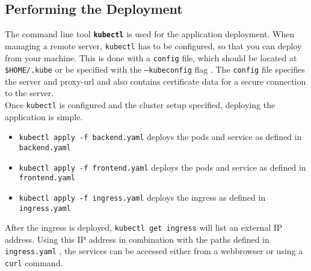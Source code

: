     \subsection{Performing the Deployment}
        The command line tool \textbf{\texttt{kubectl}} is used for the application deployment.
        When managing a remote server, \texttt{kubectl} has to be configured, so that you can deploy from your machine.
        This is done with a \texttt{config} file, which should be located at \texttt{\$HOME/.kube} or be specified with the \texttt{--kubeconfig} flag \cite{Kubernetes_kubeconfig:2022}.
        The \texttt{config} file specifies the server and proxy-url and also contains certificate data for a secure connection to the server.
        \medskip\\
        Once \texttt{kubectl} is configured and the cluster setup specified, deploying the application is simple.
        \begin{itemize}
            \item \texttt{kubectl apply -f backend.yaml} deploys the pods and service as defined in \texttt{backend.yaml}
            \item \texttt{kubectl apply -f frontend.yaml} deploys the pods and service as defined in \texttt{frontend.yaml}
            \item \texttt{kubectl apply -f ingress.yaml} deploys the ingress as defined in \texttt{ingress.yaml}
        \end{itemize}
        After the ingress is deployed, \texttt{kubectl get ingress} will list an external IP address.
        Using this IP address in combination with the paths defined in \texttt{ingress.yaml} , the services can be accessed either from a webbrowser or using a \texttt{curl} command.
    

    
    

